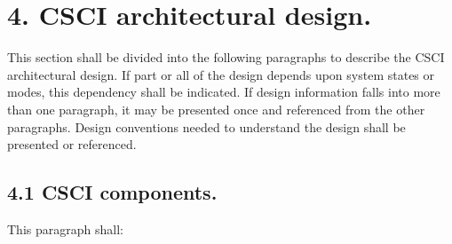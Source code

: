 \section{4. CSCI architectural design.}

This section shall be divided into the following paragraphs to describe
the CSCI architectural design. If part or all of the design depends upon
system states or modes, this dependency shall be indicated. If design
information falls into more than one paragraph, it may be presented once
and referenced from the other paragraphs. Design conventions needed to
understand the design shall be presented or referenced.

\subsection{4.1 CSCI components.}

This paragraph shall:

